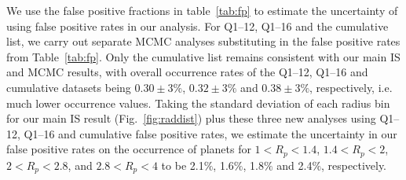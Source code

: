 
We use the false positive fractions in table~\ref{tab:fp} to estimate the uncertainty
of using \citet{Fressin2013} false positive rates in our analysis. 
For Q1--12, Q1--16 and the cumulative list, 
we carry out separate MCMC analyses substituting in the false positive rates from 
Table~\ref{tab:fp}.  Only the cumulative list remains consistent with our main IS and MCMC
results, with overall occurrence rates of the Q1--12, Q1--16 and cumulative datasets
being $0.30 \pm 3\%$, $0.32 \pm 3\%$ and $0.38 \pm 3\%$, respectively, i.e. much lower
occurrence values. 
Taking the standard deviation of each radius bin for our main IS result (Fig.~\ref{fig:raddist})
plus these three new analyses using Q1--12, Q1--16 and cumulative false positive rates, 
we estimate the uncertainty in our false 
positive rates on the occurrence of planets for $1<R_p<1.4$, $1.4<R_p<2$, $2<R_p<2.8$, and
$2.8<R_p<4$\rearth{} to be 2.1$\%$, 1.6$\%$, 1.8$\%$ and 2.4$\%$, respectively.


